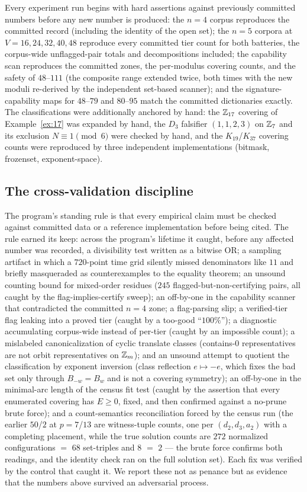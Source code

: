 Every experiment run begins with hard assertions against previously
committed numbers before any new number is produced: the $n=4$ corpus
reproduces the committed record (including the identity of the open
set); the $n=5$ corpora at $V=16,24,32,40,48$ reproduce every committed
tier count for both batteries, the corpus-wide unflagged-pair totals and
decompositions included; the capability scan reproduces the committed
zones, the per-modulus covering counts, and the safety of $48$--$111$ (the
composite range extended twice, both times with the new moduli re-derived
by the independent set-based scanner); and the signature-capability maps
for $48$--$79$ and $80$--$95$ match the committed dictionaries exactly. The classifications were additionally anchored by hand: the
$\mathbb{Z}_{17}$ covering of Example~\ref{ex:17} was expanded by hand, the
$D_3$ falsifier $(1,1,2,3)$ on $\mathbb{Z}_7$ and its exclusion
$N\equiv1\pmod6$ were checked by hand, and the $K_{19}$/$K_{37}$
covering counts were reproduced by three independent implementations
(bitmask, frozenset, exponent-space).

\subsection{The cross-validation discipline}

The program's standing rule is that every empirical claim must be checked
against committed data or a reference implementation before being cited.
The rule earned its keep: across the program's lifetime it caught, before
any affected number was recorded, a divisibility test written as a
bitwise OR; a sampling artifact in which a $720$-point time grid silently
missed denominators like $11$ and briefly masqueraded as counterexamples
to the equality theorem; an unsound counting bound for mixed-order
residues ($245$ flagged-but-non-certifying pairs, all caught by the
flag-implies-certify sweep); an off-by-one in the capability scanner that
contradicted the committed $n=4$ zone; a flag-parsing slip; a
verified-tier flag leaking into a proved tier (caught by a too-good
``$100\%$''); a diagnostic accumulating corpus-wide instead of
per-tier (caught by an impossible count); a mislabeled canonicalization
of cyclic translate classes (contains-$0$ representatives are not orbit
representatives on $\mathbb{Z}_m$); and an unsound attempt to quotient the
classification by exponent inversion (class reflection $e\mapsto-e$,
which fixes the bad set only through $B_{-w}=B_w$ and is not a covering
symmetry); an off-by-one in the minimal-arc length of the census fit test (caught by
the assertion that every enumerated covering has $E\ge0$, fixed, and then
confirmed against a no-prune brute force); and a count-semantics
reconciliation forced by the census run (the earlier $50$/$2$ at
$p=7$/$13$ are witness-tuple counts, one per $(d_2,d_3,a_2)$ with a
completing placement, while the true solution counts are $272$
normalized configurations $=$ $68$ set-triples and $8$ $=$ $2$ --- the
brute force confirms both readings, and the identity check ran on the full
solution set).
Each fix was verified by the control that caught it. We report these not
as penance but as evidence that the numbers above survived an adversarial
process.

